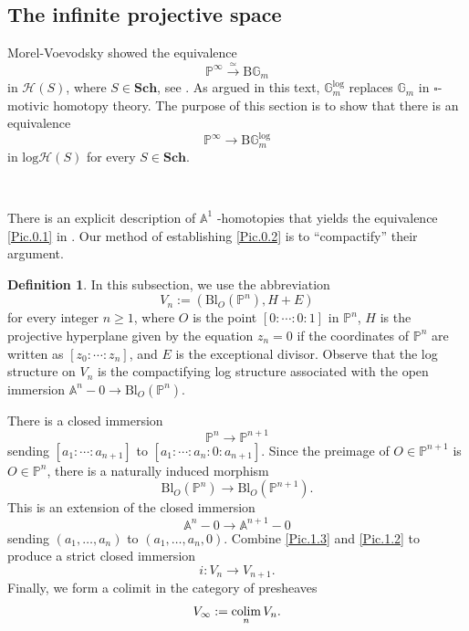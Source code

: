 \documentclass[11pt, a4paper]{amsart}
\theoremstyle{definition}
\newtheorem{df}[thm]{Definition}
\numberwithin{equation}{subsection}
\renewcommand{\P}{\mathbb{P}}
\newcommand{\A}{\mathbb{A}}
\newcommand{\G}{{\mathbb{G}}}
\newcommand{\Sch}{\mathbf{Sch}}
\newcommand{\colimit}{\mathop{\rm colim}}
\newcommand{\Blow}{{\mathrm{Bl}}}
\newcommand{\clspace}{\mathrm{B}}
\newcommand{\boxx}{\square}
\newcommand{\Gmm}{\mathbb{G}_m^{\mathrm{log}}}
\newcommand{\cptsph}[1]{V_{#1}}
\newcommand{\infH}{\mathcal{H}}
\newcommand{\inflogH}{\mathrm{log}\mathcal{H}}
\begin{document}
\subsection{The infinite projective space}
Morel-Voevodsky showed the equivalence
\begin{equation}
\label{Pic.0.1}
\P^\infty \xrightarrow{\simeq} \clspace\G_m
\end{equation}
in $\infH(S)$, where $S\in \Sch$, see \cite[Proposition 3.7, p.\ 138]{MV}.
As argued in this text, 
$\Gmm$ replaces $\G_m$ in $\boxx$-motivic homotopy theory.
The purpose of this section is to show that there is an equivalence
\begin{equation}
\label{Pic.0.2}
\P^\infty \to \clspace \Gmm
\end{equation}
in $\inflogH(S)$ for every $S\in \Sch$.

\

There is an explicit description of $\A^1$ -homotopies that yields the equivalence
\eqref{Pic.0.1} in \cite[\S 2]{zbMATH05635033}.
Our method of establishing \eqref{Pic.0.2} is to ``compactify'' their argument.

\begin{df}
In this subsection, we use the abbreviation 
\[
\cptsph{n}:=(\Blow_O(\P^n),H+E)
\]
for every integer $n\geq 1$, 
where $O$ is the point $[0:\cdots:0:1]$ in $\P^n$,
$H$ is the
projective hyperplane given by the equation $z_n=0$ if the coordinates of $\P^n$ are written as $[z_0:\cdots:z_n]$,
and $E$ is the exceptional divisor.
Observe that the log structure on $\cptsph{n}$ is the compactifying log structure 
associated with the open immersion $\A^n-0\to \Blow_O(\P^n)$.
\end{df}

There is a closed immersion
\[
\P^n\to \P^{n+1}
\]
sending $[a_1:\cdots:a_{n+1}]$ to $[a_1:\cdots:a_n:0:a_{n+1}]$.
Since the preimage of $O\in \P^{n+1}$ is $O\in \P^n$, there is a naturally induced  morphism
\begin{equation}
\label{Pic.1.3}
\Blow_O(\P^n)\to \Blow_O(\P^{n+1}).
\end{equation}
This is an extension of the closed immersion
\begin{equation}
\label{Pic.1.2}
\A^n-0\to \A^{n+1}-0
\end{equation}
sending $(a_1,\ldots,a_{n})$ to $(a_1,\ldots,a_{n},0)$.
Combine \eqref{Pic.1.3} and \eqref{Pic.1.2} to produce a strict closed immersion
\begin{equation}
\label{Pic.1.1}
i\colon \cptsph{n}\to \cptsph{n+1}.
\end{equation}
Finally, 
we form a colimit in the category of presheaves 
\[
\cptsph{\infty}
:=
\colimit_n \cptsph{n}.
\]
\end{document}
